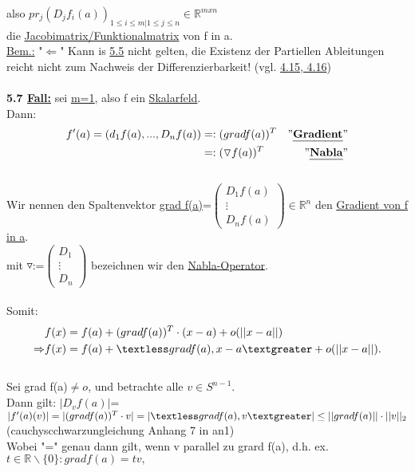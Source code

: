 \documentclass[]{scrartcl}
\begin{document}
	also $pr_j(D_jf_i(a))_{1\leq i\leq m|1\leq j\leq n}\in\mathbb{R}^{m x n}$\\
	die \ul{Jacobimatrix/Funktionalmatrix} von f in a.\\
	\underline{Bem.:} "$\Leftarrow$" Kann is \ul{5.5} nicht gelten, die Existenz der Partiellen Ableitungen reicht nicht zum Nachweis der Differenzierbarkeit! (vgl. \ul{4.15, 4.16})\\
	\\
	\textbf{5.7 \underline{Fall:}} sei \underline{\underline{m=1}}, also f ein \underline{Skalarfeld}.\\
	Dann: \begin{align}
		f'(a)=(d_1f(a),...,D_nf(a))&=:(grad f(a))^T &"\ul{\textbf{Gradient}}"\\
		&=:(\triangledown f(a))^T &"\ul{\textbf{Nabla}}"
	\end{align}\\
	Wir nennen den Spaltenvektor  \ul{grad f(a)}=$\begin{pmatrix}
		D_1f(a)\\\vdots\\D_nf(a)
	\end{pmatrix} \in \mathbb{R}^n$ den \ul{Gradient von f in a}.\\
	 mit \ul{$\triangledown$}:=$\begin{pmatrix}
		D_1\\\vdots\\D_n
	\end{pmatrix}$ bezeichnen wir den \ul{Nabla-Operator}.\\
	\\
	Somit:\begin{align}
		&f(x)=f(a)+(grad f(a))^T\cdot(x-a)+o(||x-a||)\\
		\Rightarrow &f(x)=f(a)+\textless grad f(a), x-a\textgreater + o(||x-a||).
	\end{align}\\
	Sei grad f(a)$\neq o$, und betrachte alle $v\in S^{n-1}$.\\
	Dann gilt: \ul{$|D_vf(a)|$}=$|f'(a)(v)|=|(grad f(a))^T\cdot v|\\
	=|\textless grad f(a),v\textgreater|\leq ||grad f(a)||\cdot ||v||_2$ (cauchyscchwarzungleichung Anhang 7 in an1)\\
	Wobei "=" genau dann gilt, wenn v parallel zu grard f(a), d.h. ex. $t\in\mathbb{R}\backslash\{0\}: grad f(a)=tv,$\\
\end{document}
